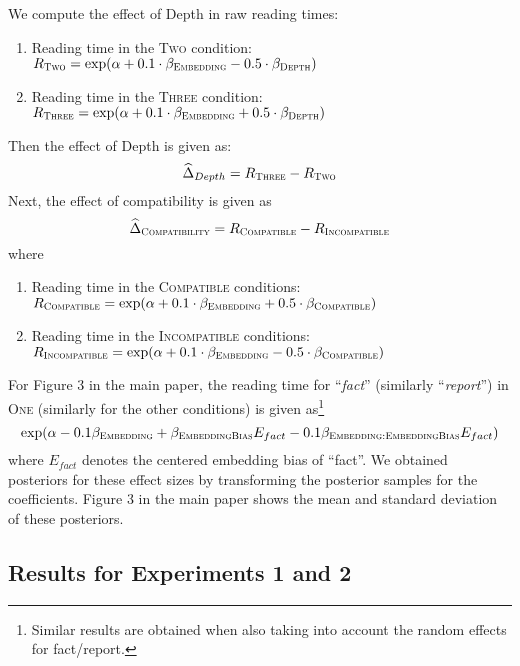 We compute the effect of Depth in raw reading times:
\begin{enumerate}
	\item Reading time in the \textsc{Two} condition: $R_{\textsc{Two}} = \exp(\alpha + 0.1 \cdot \beta_{\textsc{Embedding}} - 0.5 \cdot \beta_{\textsc{Depth}})$
	\item Reading time in the \textsc{Three} condition: $R_{\textsc{Three}} = \exp(\alpha + 0.1 \cdot \beta_{\textsc{Embedding}} + 0.5 \cdot \beta_{\textsc{Depth}})$
\end{enumerate}
Then the effect of Depth is given as:
\begin{equation}
	\widehat{\Delta}_{Depth} = R_{\textsc{Three}} - R_{\textsc{Two}}
\end{equation}
Next, the effect of compatibility is given as
\begin{equation}
	\widehat{\Delta}_{\textsc{Compatibility}} = R_{\textsc{Compatible}} - R_{\textsc{Incompatible}}
\end{equation}
where
\begin{enumerate}
	\item Reading time in the \textsc{Compatible} conditions: $R_{\textsc{Compatible}} = \exp(\alpha + 0.1 \cdot \beta_{\textsc{Embedding}} + 0.5 \cdot \beta_{\textsc{Compatible}})$
	\item Reading time in the \textsc{Incompatible} conditions: $R_{\textsc{Incompatible}} = \exp(\alpha + 0.1 \cdot \beta_{\textsc{Embedding}} - 0.5 \cdot \beta_{\textsc{Compatible}})$
\end{enumerate}

For Figure 3 in the main paper, the reading time for ``\emph{fact}'' (similarly ``\emph{report}'') in \textsc{One}  (similarly for the other conditions) is given as\footnote{Similar results are obtained when also taking into account the random effects for fact/report.}
\begin{equation}
	\exp(\alpha - 0.1 \beta_{\textsc{Embedding}} + \beta_{\textsc{EmbeddingBias}} E_{fact} - 0.1 \beta_{\textsc{Embedding}:\textsc{EmbeddingBias}} E_{fact})
\end{equation}
where $E_{fact}$ denotes the centered embedding bias of ``fact''.
We obtained posteriors for these effect sizes by transforming the posterior samples for the coefficients.
Figure 3 in the main paper shows the mean and standard deviation of these posteriors.

\subsection{Results for Experiments 1 and 2}
